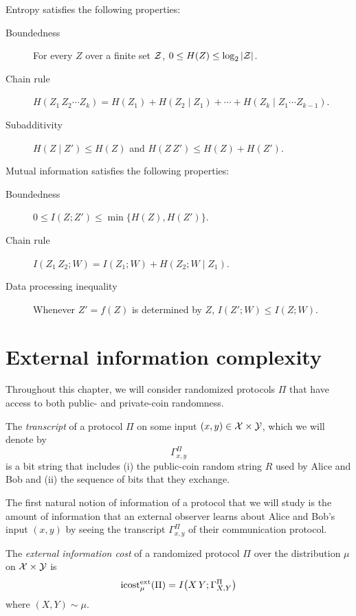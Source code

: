 \begin{theorem}
	Entropy satisfies the following properties:
	\begin{description}
		\item[Boundedness] For every $Z$ over a finite set $\mathcal{Z}$, $0 \le H(Z) \le \log_2 |\mathcal{Z}|$.
		\item[Chain rule] $H(Z_1\,Z_2\cdots Z_k) = H(Z_1) + H(Z_2 \mid Z_1) + \cdots + H(Z_k \mid Z_1\cdots Z_{k-1})$.
		\item[Subadditivity] $H(Z \mid Z') \le H(Z)$ and $H(Z\,Z') \le H(Z) + H(Z')$.
	\end{description}
	Mutual information satisfies the following properties:
	\begin{description}
		\item[Boundedness] $0 \le I(Z ; Z') \le \min\{ H(Z), H(Z') \}$.
		\item[Chain rule] $I(Z_1\,Z_2 ; W) = I(Z_1 ; W) + H(Z_2 ; W \mid Z_1)$.
		\item[Data processing inequality] Whenever $Z' = f(Z)$ is determined by $Z$, $I(Z' ; W) \le I(Z ; W)$.
	\end{description}
	
\end{theorem}




\section{External information complexity}

Throughout this chapter, we will consider randomized protocols $\Pi$ that have access to both public- and private-coin randomness. 

\begin{definition}[Transcript]
	The \emph{transcript} of a protocol $\Pi$ on some input $(x,y) \in \mathcal{X} \times \mathcal{Y}$, which we will denote by
	\[
	\Gamma_{x,y}^\Pi
	\]
	is a bit string that includes (i) the public-coin random string $R$ used by Alice and Bob and (ii) the sequence of bits that they exchange. 
\end{definition}

The first natural notion of information of a protocol that we will study is the amount of information that an external observer learns about Alice and Bob's input $(x,y)$ by seeing the transcript $\Gamma_{x,y}^\Pi$ of their communication protocol.

\begin{definition}
	The \emph{external information cost} of a randomized protocol $\Pi$ over the distribution $\mu$ on $\mathcal{X} \times \mathcal{Y}$ is
	\[
	\mathrm{icost}^{\mathrm{ext}}_\mu(\Pi) = I\big( X\,Y ; \Gamma_{X,Y}^\Pi \big)
	\]
	where $(X,Y) \sim \mu$.
\end{definition}

